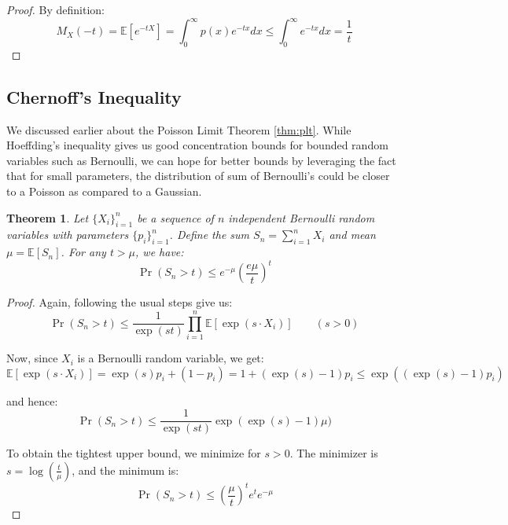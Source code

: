 \documentclass{article}
\newtheorem{theorem}{Theorem}[subsection]
\theoremstyle{remark}
\newcommand{\Exp}{\mathbb{E}}
\begin{document}
\begin{proof}
By definition:
\begin{equation*}
M_{X}(-t) = \Exp[e^{-tX}] = \int_{0}^{\infty} p(x) e^{-tx} dx \leq \int_{0}^{\infty} e^{-tx} dx = \frac{1}{t}
\end{equation*}
\end{proof}

\subsection{Chernoff's Inequality}
We discussed earlier about the Poisson Limit Theorem \ref{thm:plt}. While Hoeffding's inequality gives us good concentration bounds for bounded random variables such as Bernoulli, we can hope for better bounds by leveraging the fact that for small parameters, the distribution of sum of Bernoulli's could be closer to a Poisson as compared to a Gaussian.

\begin{theorem}
\label{thm:chernoff}
Let \(\{X_{i}\}_{i=1}^{n}\) be a sequence of \(n\) independent Bernoulli random variables with parameters \(\{p_{i}\}_{i=1}^{n}\). Define the sum \(S_{n} = \sum\limits_{i=1}^{n} X_{i}\) and mean \(\mu = \Exp\left[S_{n}\right]\). For any \(t > \mu\), we have:
\begin{equation*}
\Pr(S_{n} > t) \leq e^{-\mu} \left(\frac{e\mu}{t}\right)^{t}
\end{equation*}
\end{theorem}

\begin{proof}
Again, following the usual steps give us:
\begin{equation*}
\Pr(S_{n} > t) \leq \frac{1}{\exp(st)}\prod_{i=1}^{n}\Exp\left[\exp(s \cdot X_{i})\right] \qquad (s > 0)
\end{equation*}

Now, since \(X_{i}\) is a Bernoulli random variable, we get:
\begin{equation*}
\Exp\left[\exp(s \cdot X_{i})\right] = \exp(s)p_{i} + (1 - p_{i}) = 1 + (\exp(s) - 1)p_{i} \leq \exp((\exp(s) - 1)p_{i})
\end{equation*}

and hence:
\begin{equation*}
\Pr(S_{n} > t) \leq \frac{1}{\exp(st)}\exp(\exp(s) - 1)\mu)
\end{equation*}

To obtain the tightest upper bound, we minimize for \(s > 0\). The minimizer is \(s = \log\left(\frac{t}{\mu}\right)\), and the minimum is:
\begin{equation*}
\Pr(S_{n} > t) \leq \left(\frac{\mu}{t}\right)^{t}e^{t}e^{-\mu}
\end{equation*}
\end{proof}
\end{document}
